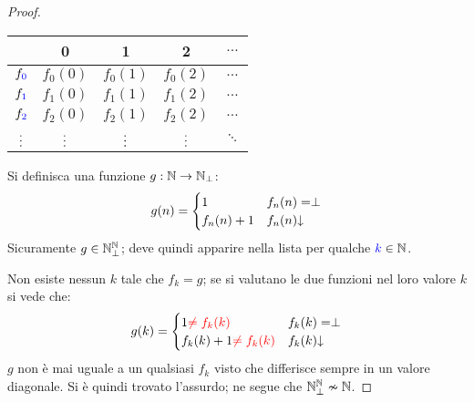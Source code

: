 \begin{itemize}
\begin{itemize}
\begin{proof}
                \begin{minipage}{.40\textwidth}
                    \begin{tabular}{c|c c c c}
                            &        0 &        1 &        2 & $\dots$  \\ \hline
                      $f_{\color{blue}0}$ & {\color{red}$f_0(0)$} & $f_0(1)$ & $f_0(2)$ & $\dots$  \\
                      $f_{\color{blue}1}$ & $f_1(0)$ & {\color{red}$f_1(1)$} & $f_1(2)$ & $\dots$  \\
                      $f_{\color{blue}2}$ & $f_2(0)$ & $f_2(1)$ & {\color{red}$f_2(2)$} & $\dots$  \\
                      $\vdots$ &    $\vdots$ &    $\vdots$ &    $\vdots$ & $\ddots$ \\                        
                    \end{tabular}
                \end{minipage}
                \begin{minipage}{.45\textwidth}
                    Si definisca una funzione $g:\mathbb{N}\to\mathbb{N}_\perp$:
                    $$ g(n) = \begin{cases}
                        1 & f_n(n)=\perp\\
                        f_n(n)+1 & f_n(n)\termina
                    \end{cases} $$
                    Sicuramente $g\in\mathbb{N}^{\mathbb{N}}_\perp$; deve quindi apparire nella lista per
                    qualche ${\color{blue}k}\in\mathbb{N}$.
                \end{minipage}
                
                Non esiste nessun $k$ tale che $f_k=g$; se si valutano le due funzioni nel
                loro valore $k$ si vede che:
                $$ g(k) = \begin{cases}
                        1{\color{red}\neq f_k(k)} & f_k(k)=\perp\\
                        f_k(k)+1{\color{red}\neq f_k(k)} & f_k(k)\termina
                    \end{cases} $$
                $g$ non è mai uguale a un qualsiasi $f_k$ visto che differisce sempre in un valore
                {\color{red}diagonale}. Si è quindi trovato l'assurdo; ne segue che
                $\mathbb{N}^{\mathbb{N}}_\perp\nsim\mathbb{N}$.
            \end{proof}
        \end{itemize}
\end{itemize}

